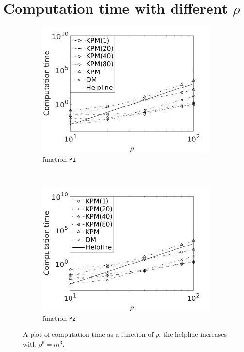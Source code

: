 \section{Computation time with different $\rho$} \label{sec:stimem}
\begin{figure}[H]
        \centering
        \begin{subfigure}[b]{0.45\textwidth}
                \includegraphics[width=\textwidth]{fig/n5timevsm1}
                \caption{function \texttt{P1}}
                \label{fig:timem1}
        \end{subfigure}%
        ~
        \begin{subfigure}[b]{0.45\textwidth}
                \includegraphics[width=\textwidth]{fig/n6timevsm2}
                \caption{function \texttt{P2}}
                \label{fig:timem2}
        \end{subfigure}
        \caption{A plot of computation time as a function of $\rho$, the helpline increases with $\rho^6 = m^3$.}\label{fig:timem}
\end{figure}
